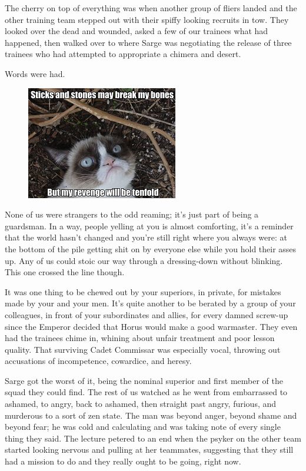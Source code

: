 The cherry on top of everything was when another group of fliers landed and the other training team stepped out with their spiffy looking recruits in tow. 
They looked over the dead and wounded, asked a few of our trainees what had happened, then walked over to where Sarge was negotiating the release of three trainees who had attempted to appropriate a chimera and desert.

Words were had.

\begin{figure}
	\begin{center}
		\includegraphics[width=\figwidth]{pics/8/21.png}
	\end{center}
\end{figure}
None of us were strangers to the odd reaming; 
it’s just part of being a guardsman. 
In a way, people yelling at you is almost comforting, it’s a reminder that the world hasn’t changed and you’re still right where you always were: 
at the bottom of the pile getting shit on by everyone else while you hold their asses up. 
Any of us could stoic our way through a dressing-down without blinking. 
This one crossed the line though.

It was one thing to be chewed out by your superiors, in private, for mistakes made by your and your men. 
It’s quite another to be berated by a group of your colleagues, in front of your subordinates and allies, for every damned screw-up since the Emperor decided that Horus would make a good warmaster. 
They even had the trainees chime in, whining about unfair treatment and poor lesson quality. 
That surviving Cadet Commissar was especially vocal, throwing out accusations of incompetence, cowardice, and heresy.

Sarge got the worst of it, being the nominal superior and first member of the squad they could find. 
The rest of us watched as he went from embarrassed to ashamed, to angry, back to ashamed, then straight past angry, furious, and murderous to a sort of zen state. 
The man was beyond anger, beyond shame and beyond fear; 
he was cold and calculating and was taking note of every single thing they said. 
The lecture petered to an end when the psyker on the other team started looking nervous and pulling at her teammates, suggesting that they still had a mission to do and they really ought to be going, right now.

